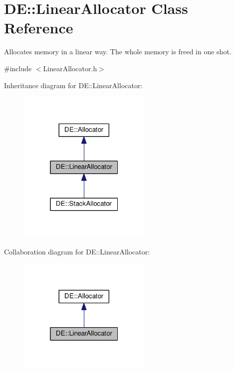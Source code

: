\hypertarget{classDE_1_1LinearAllocator}{}\section{DE\+:\+:Linear\+Allocator Class Reference}
\label{classDE_1_1LinearAllocator}


Allocates memory in a linear way. The whole memory is freed in one shot.  




{\ttfamily \#include $<$Linear\+Allocator.\+h$>$}



Inheritance diagram for DE\+:\+:Linear\+Allocator\+:
\nopagebreak
\begin{figure}[H]
\begin{center}
\leavevmode
\includegraphics[width=181pt]{classDE_1_1LinearAllocator__inherit__graph}
\end{center}
\end{figure}


Collaboration diagram for DE\+:\+:Linear\+Allocator\+:
\nopagebreak
\begin{figure}[H]
\begin{center}
\leavevmode
\includegraphics[width=181pt]{classDE_1_1LinearAllocator__coll__graph}
\end{center}
\end{figure}
